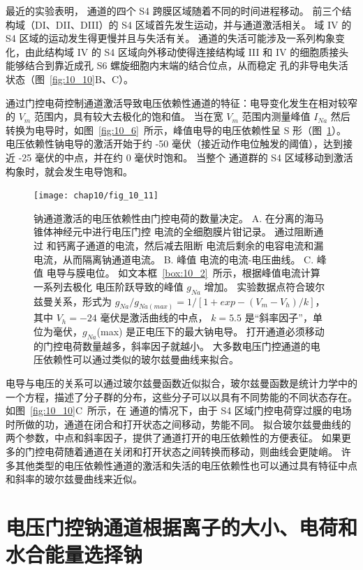 最近的实验表明， 通道的四个 S4 跨膜区域随着不同的时间进程移动。 
前三个结构域（DI、DII、DIII）的 S4 区域首先发生运动，并与通道激活相关。 
域 IV 的 S4 区域的运动发生得更慢并且与失活有关。 
 通道的失活可能涉及一系列构象变化，由此结构域 IV 的 S4 区域向外移动使得连接结构域 III 和 IV 的细胞质接头能够结合到靠近成孔 S6 螺旋细胞内末端的结合位点，从而稳定 孔的非导电失活状态（图~\ref{fig:10_10}B、C）。


通过门控电荷控制通道激活导致电压依赖性通道的特征：电导变化发生在相对较窄的 $V_m$ 范围内，具有较大去极化的饱和值。
当在宽 $V_m$ 范围内测量峰值 $I_{Na}$ 然后转换为电导时，如图~\ref{fig:10_6}~所示，峰值电导的电压依赖性呈 S 形（图~\ref{fig:10_11}）。
电压依赖性钠电导的激活开始于约 -50 毫伏（接近动作电位触发的阈值），达到接近 -25 毫伏的中点，并在约 0 毫伏时饱和。 
当整个  通道群的 S4 区域移动到激活构象时，就会发生电导饱和。


\begin{figure}[htbp]
	\centering
	\texttt{[image: chap10/fig\_10\_11]}
	\caption{钠通道激活的电压依赖性由门控电荷的数量决定。
		A. 在分离的海马锥体神经元中进行电压门控  电流的全细胞膜片钳记录。
		通过阻断通过  和钙离子通道的电流，然后减去阻断  电流后剩余的电容电流和漏电流，从而隔离钠通道电流。
		B. 峰值  电流的电流-电压曲线。
		C. 峰值  电导与膜电位。 如文本框~\ref{box:10_2}~所示，根据峰值电流计算一系列去极化
		电压阶跃导致的峰值 $g_{Na}$ 增加。
		实验数据点符合玻尔兹曼关系，形式为 $g_{Na} / g_{Na(max)} = 1 / [1 + exp - (V_m - V_h) / k]$，其中 $V_h = −24$ 毫伏是激活曲线的中点， $k = 5.5$ 是“斜率因子”，单位为毫伏，$g_{Na}$(max) 是正电压下的最大钠电导。
		打开通道必须移动的门控电荷数量越多，斜率因子就越小。
		大多数电压门控通道的电压依赖性可以通过类似的玻尔兹曼曲线来拟合。}
	\label{fig:10_11}
\end{figure}


电导与电压的关系可以通过玻尔兹曼函数近似拟合，玻尔兹曼函数是统计力学中的一个方程，描述了分子群的分布，这些分子可以以具有不同势能的不同状态存在。
如图~\ref{fig:10_10}C~所示，在  通道的情况下，由于 S4 区域门控电荷穿过膜的电场时所做的功，通道在闭合和打开状态之间移动，势能不同。
拟合玻尔兹曼曲线的两个参数，中点和斜率因子，提供了通道打开的电压依赖性的方便表征。
如果更多的门控电荷随着通道在关闭和打开状态之间转换而移动，则曲线会更陡峭。
许多其他类型的电压依赖性通道的激活和失活的电压依赖性也可以通过具有特征中点和斜率的玻尔兹曼曲线来近似。


\section{电压门控钠通道根据离子的大小、电荷和水合能量选择钠}

